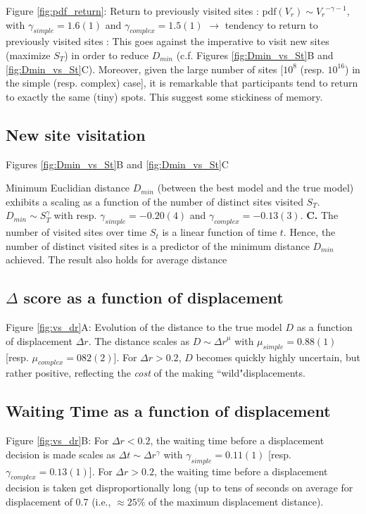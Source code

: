 Figure \ref{fig:pdf_return}: Return to previously visited sites : $\mathrm{pdf}(V_r) \sim {V_r}^{- \gamma -1}$, with $\gamma_{simple} = 1.6(1)$ and $\gamma_{complex} = 1.5(1)$ $\rightarrow$ tendency to return to previously visited sites : This goes against the imperative to visit new sites (maximize $S_T$) in order to reduce $D_{min}$ (c.f. Figures \ref{fig:Dmin_vs_St}B and \ref{fig:Dmin_vs_St}C). Moreover, given the large number of sites [$10^{8}$ (resp. $10^{16}$) in the simple (resp. complex) case], it is remarkable that participants tend to return to exactly the same (tiny) spots. This suggest some stickiness of memory.


\subsection{New site visitation}

Figures \ref{fig:Dmin_vs_St}B and \ref{fig:Dmin_vs_St}C

Minimum Euclidian distance $D_{min}$ (between the best model and the true model) exhibits a scaling as a function of the number of distinct sites visited $S_{T}$. $D_{min} \sim S_{T}^{\gamma}$ with resp. $\gamma_{simple} = -0.20(4)$ and $\gamma_{complex} = - 0.13(3)$. {\bf C.} The number of visited sites over time $S_t$ is a linear function of time $t$. Hence, the number of distinct visited sites is a predictor of the minimum distance $D_{min}$ achieved. The result also holds for average distance



\subsection{$\Delta$ score as a function of displacement}

Figure \ref{fig:vs_dr}A: Evolution of the distance to the true model $D$ as a function of displacement $\Delta r$. The distance scales as $D \sim {\Delta r}^{\mu}$ with $\mu_{simple} = 0.88(1)$ [resp. $\mu_{complex} = 082(2)$]. For $\Delta r > 0.2$, $D$ becomes quickly highly uncertain, but rather positive, reflecting the {\it cost} of the making ``wild"displacements. 

\subsection{Waiting Time as a function of displacement}

Figure \ref{fig:vs_dr}B: For $\Delta r < 0.2$, the waiting time before a displacement decision is made scales as $\Delta t \sim \Delta r^{\gamma}$ with $\gamma_{simple} = 0.11(1)$ [resp. $\gamma_{complex} = 0.13(1)$]. For $\Delta r > 0.2$, the waiting time before a displacement decision is taken get disproportionally long (up to tens of seconds on average for displacement of 0.7 (i.e., $\approx 25\%$ of the maximum displacement distance). 

